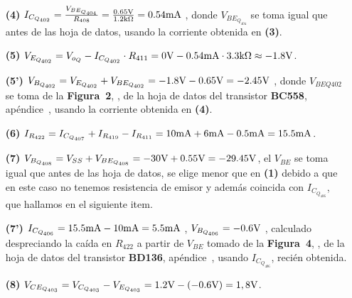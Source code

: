 \begin{sloppypar}
\begin{enumerate}
\item[\textbf{(4)}] $I_{C_{Q_{402}}}=\frac{V_{BE_{Q_{404}}}}{R_{408}} =  \frac{0.65 \si[per-mode=symbol]{\volt}}{1.2 \si[per-mode=symbol]{\kilo\ohm}}  = 0.54 \si[per-mode=symbol]{\milli\ampere}$ , donde $V_{BE_{Q_{404}}}$ se toma igual que antes de las hoja de datos, usando la corriente obtenida en \textbf{(3)}.


\item[\textbf{(5)}] $V_{E_{Q_{402}}}=V_{o_{Q}}-I_{C_{Q_{402}}} \cdot R_{411} = 0 \si[per-mode=symbol]{\volt} - 0.54 \si[per-mode=symbol]{\milli\ampere} \cdot 3.3 \si[per-mode=symbol]{\kilo\ohm} \approx -1.8 \si[per-mode=symbol]{\volt}$.


\item[\textbf{(5')}] $V_{B_{Q_{402}}} = V_{E_{Q_{402}}} + V_{BE_{Q_{402}}} = -1.8 \si[per-mode=symbol]{\volt} - 0.65 \si[per-mode=symbol]{\volt} = -2.45 \si[per-mode=symbol]{\volt}$ , donde $V_{BEQ402}$ se toma de la \textbf{Figura~2}, , de la hoja de datos del transistor \textbf{BC558}, apéndice~, usando la corriente obtenida en \textbf{(4)}.

\item[\textbf{(6)}] $I_{R_{422}} = I_{C_{Q_{407}}}+I_{R_{419}}-I_{R_{411}} = 10 \si[per-mode=symbol]{\milli\ampere} + 6 \si[per-mode=symbol]{\milli\ampere} - 0.5 \si[per-mode=symbol]{\milli\ampere} = 15.5 \si[per-mode=symbol]{\milli\ampere} $.

\item[\textbf{(7)}] $V_{B_{Q_{408}}} = V_{SS} + V_{BE_{Q_{408}}} = -30 \si[per-mode=symbol]{\volt} + 0.55 \si[per-mode=symbol]{\volt} = -29.45 \si[per-mode=symbol]{\volt} $, el $V_{BE}$ se toma igual que antes de las hoja de datos, se elige menor que en \textbf{(1)} debido a que en este caso no tenemos resistencia de emisor y además coincida con $I_{C_{Q_{406}}}$, que hallamos en el siguiente item.


\item[\textbf{(7')}] $I_{C_{Q_{406}}} = 15.5 \si[per-mode=symbol]{\milli\ampere} - 10 \si[per-mode=symbol]{\milli\ampere} = 5.5 \si[per-mode=symbol]{\milli\ampere} $ , $V_{B_{Q_{406}}} = -0.6 \si[per-mode=symbol]{\volt} $ , calculado despreciando la caída en $R_{422}$ a partir de $V_{BE}$ tomado de la \textbf{Figura~4}, , de la hoja de datos del transistor \textbf{BD136}, apéndice~, usando $I_{C_{Q_{406}}}$, recién obtenida.


\item[\textbf{(8)}] $V_{CE_{Q_{403}}} = V_{C_{Q_{403}}} - V_{E_{Q_{403}}} = 1.2 \si[per-mode=symbol]{\volt} - (-0.6 \si[per-mode=symbol]{\volt}) = 1,8 \si[per-mode=symbol]{\volt} $.



\end{enumerate}
\end{sloppypar}
